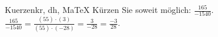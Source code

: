 \begin{MAufgabe}{Kuerzen}{kr, dh, MaTeX}
K\"urzen Sie soweit m\"oglich: $\frac{165}{-1540}$.\\ 
\ifLsg\MLoesung
\quad $\frac{165}{-1540}=\frac{(55)\cdot(3)}{(55)\cdot(-28)}=\frac{3}{-28}=\frac{-3}{28}$.\else\relax\fi
 \end{MAufgabe}